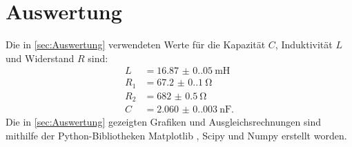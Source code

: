 \section{Auswertung}
\label{sec:Auswertung}
Die in \autoref{sec:Auswertung} verwendeten Werte für die Kapazität $C$, Induktivität $L$ und Widerstand $R$ sind:
\begin{align*}
  L &= \SI{16.87(0.05)}{\milli\henry} \\
  R_1 &= \SI{67.2(0.1)}{\ohm}\\
  R_2 &= \SI{682(0.5)}{\ohm}\\
  C &= \SI{2.060(0.003)}{\nano\farad}.
\end{align*}
Die in \autoref{sec:Auswertung} gezeigten Grafiken und Ausgleichsrechnungen sind mithilfe der Python-Bibliotheken Matplotlib \cite{matplotlib}, Scipy \cite{scipy} und Numpy \cite{numpy}
erstellt worden.
